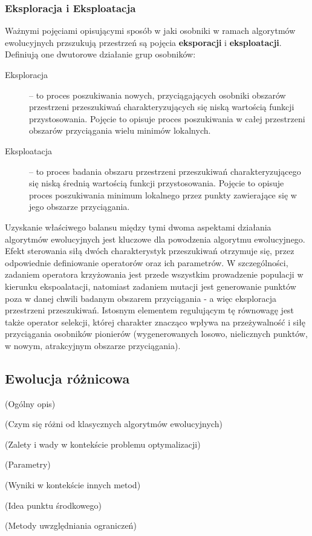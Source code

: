 \documentclass[11pt,a4paper]{report}
\begin{document}
{{\subsubsection{Eksploracja i Eksploatacja}
\par{
Ważnymi pojęciami opisującymi sposób w jaki osobniki w ramach algorytmów ewolucyjnych przszukują przestrzeń są pojęcia \textbf{eksporacji} i \textbf{eksploatacji}. Definiują one dwutorowe działanie grup osobników:
\begin{description}
  \item[Eksploracja] -- to proces poszukiwania nowych, przyciągających osobniki obszarów przestrzeni przeszukiwań charakteryzujących się niską wartością funkcji przystosowania. Pojęcie to opisuje proces poszukiwania w całej przestrzeni obszarów przyciągania wielu minimów lokalnych. 
  \item[Eksploatacja] -- to proces badania obszaru przestrzeni przeszukiwań charakteryzującego się niską średnią wartością funkcji przystosowania. Pojęcie to opisuje proces poszukiwania minimum lokalnego przez punkty zawierające się w jego obszarze przyciągania.
\end{description}
}
\par{
Uzyskanie właściwego balansu między tymi dwoma aspektami działania algorytmów ewolucyjnych jest kluczowe dla powodzenia algorytmu ewolucyjnego. Efekt sterowania siłą dwóch charakterystyk przeszukiwań otrzymuje się, przez odpowiednie definiowanie operatorów oraz ich parametrów. W szczególności, zadaniem operatora krzyżowania jest przede wszystkim prowadzenie populacji w kierunku ekspoalatacji, natomiast zadaniem mutacji jest generowanie punktów poza w danej chwili badanym obszarem przyciągania - a więc eksploracja przestrzeni przeszukiwań. Istosnym elementem regulującym tę równowagę jest także operator selekcji, której charakter znacząco wpływa na przeżywalność i siłę przyciągania osobników pionierów (wygenerowanych losowo, nielicznych punktów, w nowym, atrakcyjnym obszarze przyciągania).
}

\subsection{Ewolucja różnicowa}
\label{DEvol_section}
\par{
(Ogólny opis)
}
\par{
(Czym się różni od klasycznych algorytmów ewolucyjnych)
}
\par{
(Zalety i wady w kontekście problemu optymalizacji)
}
\par{
(Parametry)
}
\par{
(Wyniki w kontekście innych metod)
}
\par{
(Idea punktu środkowego)
}
\par{
(Metody uwzględniania ograniczeń)
}

}}
\end{document}
